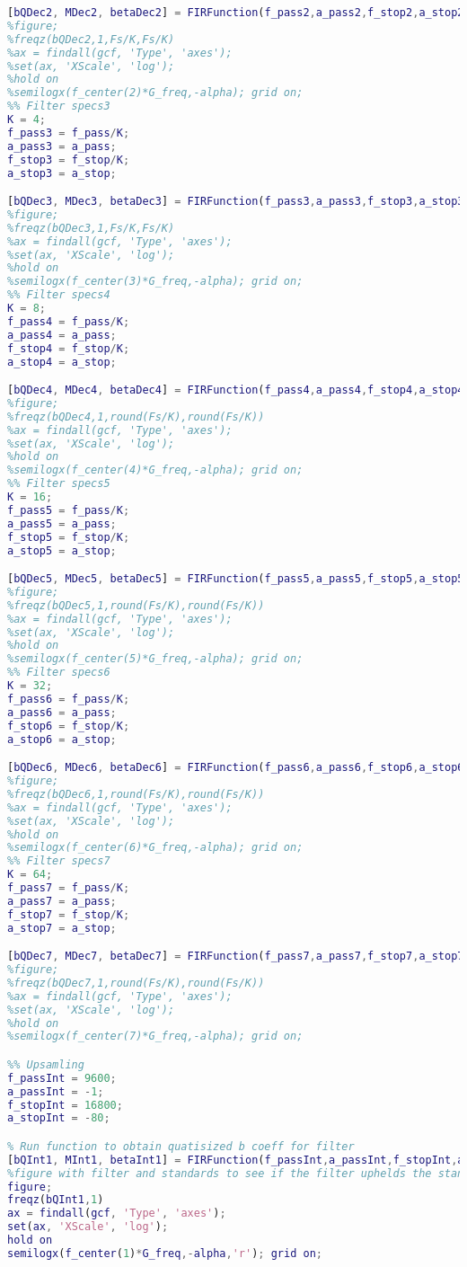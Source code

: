 \begin{lstlisting}[language=Matlab, caption = {Matlab script for designing FIR filters},label={ls:FIRMatlabScript}]
[bQDec2, MDec2, betaDec2] = FIRFunction(f_pass2,a_pass2,f_stop2,a_stop2,Fs/K);
%figure;
%freqz(bQDec2,1,Fs/K,Fs/K)
%ax = findall(gcf, 'Type', 'axes');
%set(ax, 'XScale', 'log');
%hold on 
%semilogx(f_center(2)*G_freq,-alpha); grid on;
%% Filter specs3
K = 4;
f_pass3 = f_pass/K;
a_pass3 = a_pass;
f_stop3 = f_stop/K;
a_stop3 = a_stop;

[bQDec3, MDec3, betaDec3] = FIRFunction(f_pass3,a_pass3,f_stop3,a_stop3,Fs/K);
%figure;
%freqz(bQDec3,1,Fs/K,Fs/K)
%ax = findall(gcf, 'Type', 'axes');
%set(ax, 'XScale', 'log');
%hold on 
%semilogx(f_center(3)*G_freq,-alpha); grid on;
%% Filter specs4
K = 8;
f_pass4 = f_pass/K;
a_pass4 = a_pass;
f_stop4 = f_stop/K;
a_stop4 = a_stop;

[bQDec4, MDec4, betaDec4] = FIRFunction(f_pass4,a_pass4,f_stop4,a_stop4,round(Fs/K));
%figure;
%freqz(bQDec4,1,round(Fs/K),round(Fs/K))
%ax = findall(gcf, 'Type', 'axes');
%set(ax, 'XScale', 'log');
%hold on 
%semilogx(f_center(4)*G_freq,-alpha); grid on;
%% Filter specs5
K = 16;
f_pass5 = f_pass/K;
a_pass5 = a_pass;
f_stop5 = f_stop/K;
a_stop5 = a_stop;

[bQDec5, MDec5, betaDec5] = FIRFunction(f_pass5,a_pass5,f_stop5,a_stop5,round(Fs/K));
%figure;
%freqz(bQDec5,1,round(Fs/K),round(Fs/K))
%ax = findall(gcf, 'Type', 'axes');
%set(ax, 'XScale', 'log');
%hold on 
%semilogx(f_center(5)*G_freq,-alpha); grid on;
%% Filter specs6
K = 32;
f_pass6 = f_pass/K;
a_pass6 = a_pass;
f_stop6 = f_stop/K;
a_stop6 = a_stop;

[bQDec6, MDec6, betaDec6] = FIRFunction(f_pass6,a_pass6,f_stop6,a_stop6,round(Fs/K));
%figure;
%freqz(bQDec6,1,round(Fs/K),round(Fs/K))
%ax = findall(gcf, 'Type', 'axes');
%set(ax, 'XScale', 'log');
%hold on 
%semilogx(f_center(6)*G_freq,-alpha); grid on;
%% Filter specs7
K = 64;
f_pass7 = f_pass/K;
a_pass7 = a_pass;
f_stop7 = f_stop/K;
a_stop7 = a_stop;

[bQDec7, MDec7, betaDec7] = FIRFunction(f_pass7,a_pass7,f_stop7,a_stop7,round(Fs/K));
%figure;
%freqz(bQDec7,1,round(Fs/K),round(Fs/K))
%ax = findall(gcf, 'Type', 'axes');
%set(ax, 'XScale', 'log');
%hold on 
%semilogx(f_center(7)*G_freq,-alpha); grid on;

%% Upsamling
f_passInt = 9600;
a_passInt = -1;
f_stopInt = 16800;
a_stopInt = -80;

% Run function to obtain quatisized b coeff for filter
[bQInt1, MInt1, betaInt1] = FIRFunction(f_passInt,a_passInt,f_stopInt,a_stopInt,Fs); 
%figure with filter and standards to see if the filter uphelds the standard
figure;
freqz(bQInt1,1)
ax = findall(gcf, 'Type', 'axes');
set(ax, 'XScale', 'log');
hold on 
semilogx(f_center(1)*G_freq,-alpha,'r'); grid on;


\end{lstlisting}
